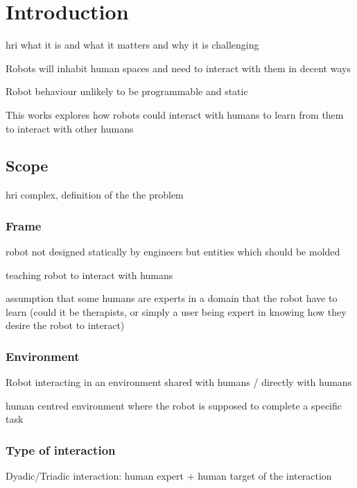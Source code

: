 \chapter{Introduction} \label{chap:intro}
\graphicspath{{images/intro/}}

\gls{hri} what it is and what it matters and why it is challenging

Robots will inhabit human spaces and need to interact with them in decent ways

Robot behaviour unlikely to be programmable and static

This works explores how robots could interact with humans to learn from them to interact with other humans

\section{Scope}\label{sec:intro-scope}
\gls{hri} complex, definition of the the problem

\subsection{Frame}

robot not designed statically by engineers but entities which should be molded

teaching robot to interact with humans

assumption that some humans are experts in a domain that the robot have to learn
(could it be therapists, or simply a user being expert in knowing how they desire the robot to interact)

\subsection{Environment} \label{sec:scope-social}
Robot interacting in an environment shared with humans / directly with humans

human centred environment where the robot is supposed to complete a specific task

\subsection{Type of interaction}
Dyadic/Triadic interaction:
human expert + human target of the interaction

